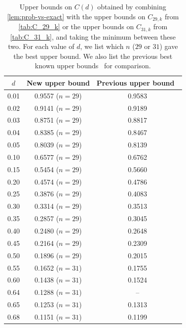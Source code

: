 \documentclass[11pt]{article}
\begin{document}
\begin{table}[]
    \centering
    \caption{
    Upper bounds on $C(d)$ obtained by combining \cref{lem:prob-vs-exact} with the upper bounds on $C_{29,k}$ from \cref{tab:C_29_k} or the upper bounds on $C_{31,k}$ from \cref{tab:C_31_k}, and taking the minimum between these two.
    For each value of $d$, we list which $n$ ($29$ or $31$) gave the best upper bound.
    We also list the previous best known upper bounds~\cite{RC23} for comparison.}
    \label{tab:C_d}
    \begin{tabular}{c|c|c}
        \hline
        $d$ & New upper bound& Previous upper bound~\cite{RC23} \\
        \hline
        0.01 & 0.9557 ($n=29$) & 0.9583 \\
        0.02 & 0.9141 ($n=29$) & 0.9189 \\
        0.03 & 0.8751 ($n=29$) & 0.8817 \\
        0.04 & 0.8385 ($n=29$) & 0.8467 \\
        0.05 & 0.8039 ($n=29$) & 0.8139 \\
        0.10 & 0.6577 ($n=29$) & 0.6762 \\
        0.15 & 0.5454 ($n=29$) & 0.5660 \\
        0.20 & 0.4574 ($n=29$) & 0.4786 \\
        0.25 & 0.3876 ($n=29$) & 0.4083 \\
        0.30 & 0.3314 ($n=29$) & 0.3513 \\
        0.35 & 0.2857 ($n=29$) & 0.3045  \\
        0.40 & 0.2480 ($n=29$) & 0.2648   \\
        0.45 & 0.2164 ($n=29$) &  0.2309   \\
        0.50 & 0.1896 ($n=29$) &   0.2015   \\
        0.55 & 0.1652 ($n=31$) &    0.1755   \\
        0.60 & 0.1438 ($n=31$) &    0.1524   \\
        0.64 & 0.1288 ($n=31$) & --\\
        0.65 & 0.1253 ($n=31$) &     0.1313   \\
        0.68 & 0.1151 ($n=31$) &      0.1199   \\
        
        
        
        
        
        \hline
    \end{tabular}
\end{table}
\end{document}
